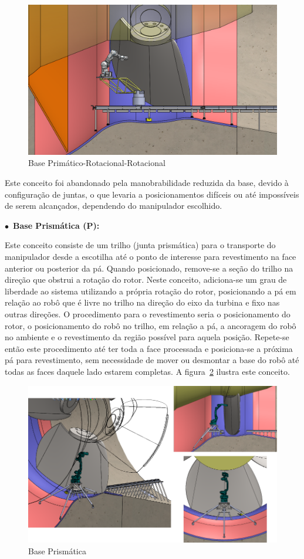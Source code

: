   \begin{figure}[h!]
   \centering
   \includegraphics[width=0.8\columnwidth]{figs/bases/base_prr}
   \caption{Base Primático-Rotacional-Rotacional}
   \label{fig::base_prr}
\end{figure}

  Este conceito foi abandonado pela manobrabilidade reduzida da base, devido à
  configuração de juntas, o que levaria a posicionamentos difíceis ou até
  impossíveis de serem alcançados, dependendo do manipulador escolhido.
  
$\bullet$~\textbf{Base Prismática (P):}

  Este conceito consiste de um trilho (junta prismática) para o transporte do
  manipulador desde a escotilha até o ponto de interesse para revestimento na
  face anterior ou posterior da pá. Quando posicionado, remove-se a seção
  do trilho na direção que obstrui a rotação do rotor. Neste conceito,
  adiciona-se um grau de liberdade ao sistema utilizando a própria rotação do
  rotor, posicionando a pá em relação ao robô que é livre no trilho na direção
  do eixo da turbina e fixo nas outras direções. O procedimento para o
  revestimento seria o posicionamento do rotor, o posicionamento do robô no
  trilho, em relação a pá, a ancoragem do robô no ambiente e o revestimento da 
  região possível para aquela posição.
  Repete-se então este procedimento até ter toda a face processada e
  posiciona-se a próxima pá para revestimento, sem necessidade de mover ou
  desmontar a base do robô até todas as faces daquele lado estarem completas.  A
  figura~\ref{fig::base_p} ilustra este conceito.
  
  \begin{figure}[h!]
   \centering
   \includegraphics[width=0.8\columnwidth]{figs/bases/base_p}
   \caption{Base Prismática}
   \label{fig::base_p}
\end{figure}

